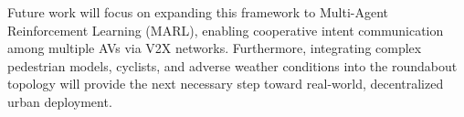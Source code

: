 \documentclass[conference]{IEEEtran}
\begin{document}
Future work will focus on expanding this framework to Multi-Agent Reinforcement Learning (MARL), enabling cooperative intent communication among multiple AVs via V2X networks. Furthermore, integrating complex pedestrian models, cyclists, and adverse weather conditions into the roundabout topology will provide the next necessary step toward real-world, decentralized urban deployment.

\balance %



\end{document}
